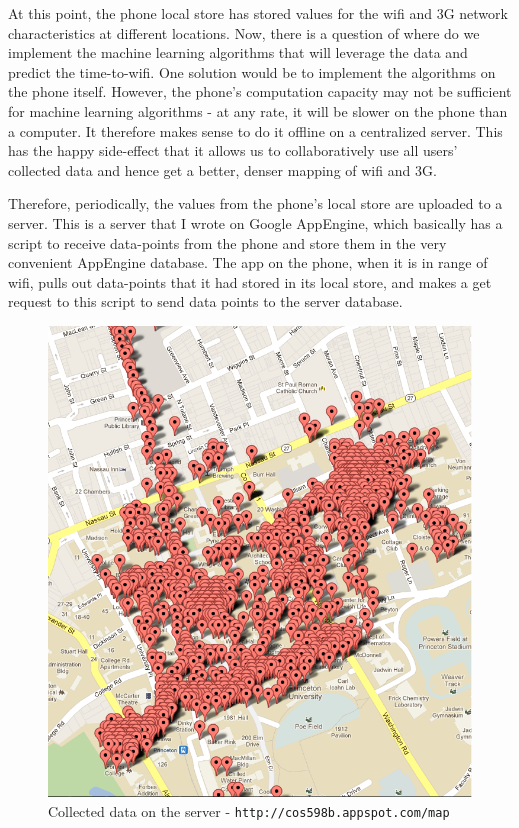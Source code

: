 \documentclass[12pt, fleqn]{article}
\begin{document}
At this point, the phone local store has stored values for the wifi and 3G network 
characteristics at different locations. Now, there is a question of where do we implement the machine 
learning algorithms that will leverage the data and predict the time-to-wifi. 
One solution would be to implement the algorithms on the phone itself. However, 
the phone's computation capacity may not be sufficient for machine 
learning algorithms - at any rate, it will be slower on the phone than a computer. It therefore makes 
sense to do it offline on a centralized server. This has the happy side-effect 
that it allows us to collaboratively use all users' collected data and hence 
get a better, denser mapping of wifi and 3G. 

Therefore, periodically, the values from the phone's local store are uploaded to a server. This is a server that I 
wrote on Google AppEngine, which basically has a script to receive 
data-points from the phone and store them in the very convenient AppEngine 
database. The app on the phone, when it is in range of wifi, pulls out data-points that it 
had stored in its local store, and makes a get request to this script to send data points to the 
server database. 

\medskip
\begin{figure}[htp]
\centering
\includegraphics[scale=0.5]{img/map3033.png}
\caption{Collected data on the server - \texttt{http://cos598b.appspot.com/map}\label{fig-map-data}}
\end{figure}
\medskip
\end{document}
